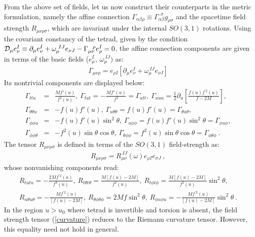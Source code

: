 \documentclass[preprint,aps,superscriptaddress,nofootinbib]{revtex4-1}
\newcommand{\del}{\partial}
\begin{document}
From the above set of fields, let us now construct their counterparts in 
the metric formulation,
 namely the affine connection $\Gamma_{\alpha\beta\rho}\equiv 
\Gamma_{\alpha\beta}^{~~\sigma}g_{\rho\sigma}$ and the spacetime field 
strength $R_{\mu\nu\rho\sigma}$, which are invariant under the internal 
$SO(3,1)$ rotations. 
Using the covariant constancy of the tetrad, given by the condition 
${\cal D}_{\mu} e_{\nu}^I \equiv \del_{\mu} e_{\nu}^I 
+\omega_{\mu}^{~IJ}e_{\nu J}-\Gamma_{\mu\nu}^{~~\rho}e_{\rho}^I=0$, 
the affine connection components are given in terms of the basic 
fields ($e_\mu^I,~\omega_\mu^{~IJ})$ as:
\begin{eqnarray}\label{gamma1}
\Gamma_{\mu\nu\rho}=e_{\rho I} \left[\del_\mu 
e_\nu^I+\omega_\mu^{~IJ}e_{\nu J}\right]
\end{eqnarray}
Its nontrivial components are displayed below:
\begin{eqnarray}\label{gamma2}
\Gamma_{ttu}&=&\frac{Mf'(u)}{f^2(u)},~\Gamma_{tut}=-\frac{Mf'(u)}
{f^2}=\Gamma_{utt},~\Gamma_{uuu}=\frac{1}{2}\del_u 
\left[\frac{f(u)f^{'2}(u)}{f-2M}\right],\nonumber\\
\Gamma_{\theta\theta u}&=&-f(u)f'(u),
~\Gamma_{u\theta\theta}=f(u)f'(u)=\Gamma_{\theta u\theta},\nonumber\\
\Gamma_{\phi\phi u}&=&-f(u)f'(u) \sin^2 \theta,~
\Gamma_{u\phi\phi}=f(u)f'(u)\sin^2 \theta=\Gamma_{\phi u\phi},\nonumber\\
\Gamma_{\phi\phi\theta}&=&-
f^2(u)\sin\theta\cos\theta,~\Gamma_{\theta\phi\phi}=f^2 (u)\sin\theta 
\cos\theta=\Gamma_{\phi \theta\phi}~.
\end{eqnarray}
 The tensor $R_{\mu\nu\rho\sigma}$ is defined in terms of the $SO(3,1)$ 
field-strength as:
\begin{eqnarray}\label{curvature}
R_{\mu\nu\rho\sigma}=R_{\mu \nu}^{~IJ}(\omega) e_{\rho I} e_{\sigma J}~,
\end{eqnarray}
whose nonvanishing components read:
\begin{eqnarray}\label{riemann1}
R_{tutu}=-\frac{2Mf^{'2}(u)}{f^3(u)},~R_{t\theta t\theta}=\frac{M[f(u)-2M]}
{f^2(u)},~R_{t\phi t\phi}=\frac{M[f(u)-2M]}{f^2(u)} \sin^2 \theta,
\nonumber\\
R_{u\theta u\theta}=-\frac{Mf^{'2}(u)}{[f(u)-2M]},~R_{\theta\phi 
\theta\phi}=2Mf\sin^2 \theta,~R_{\phi u \phi u}=-\frac{Mf^{'2}(u)}
{[f(u)-2M]} \sin^2 \theta ~.
\end{eqnarray}
In the region $u>u_0$ where tetrad is invertible and torsion is absent, 
the field strength tensor (\ref{curvature}) reduces to the Riemann 
curvature tensor. However, this equality need not hold in general.
\end{document}

